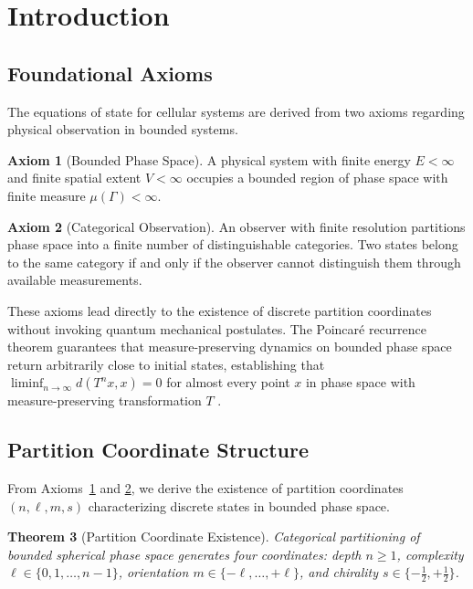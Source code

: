 \documentclass[12pt,a4paper]{article}
\theoremstyle{plain}
\newtheorem{theorem}{Theorem}[section]
\theoremstyle{definition}
\newtheorem{axiom}[theorem]{Axiom}
\theoremstyle{remark}
\begin{document}
\tableofcontents
\newpage

\section{Introduction}
\label{sec:introduction}

\subsection{Foundational Axioms}

The equations of state for cellular systems are derived from two axioms regarding physical observation in bounded systems.

\begin{axiom}[Bounded Phase Space]
\label{ax:bounded}
A physical system with finite energy $E < \infty$ and finite spatial extent $V < \infty$ occupies a bounded region of phase space with finite measure $\mu(\Gamma) < \infty$.
\end{axiom}

\begin{axiom}[Categorical Observation]
\label{ax:categorical}
An observer with finite resolution partitions phase space into a finite number of distinguishable categories. Two states belong to the same category if and only if the observer cannot distinguish them through available measurements.
\end{axiom}

These axioms lead directly to the existence of discrete partition coordinates without invoking quantum mechanical postulates. The Poincaré recurrence theorem \citep{poincare1890probleme} guarantees that measure-preserving dynamics on bounded phase space return arbitrarily close to initial states, establishing that $\liminf_{n \to \infty} d(T^n x, x) = 0$ for almost every point $x$ in phase space with measure-preserving transformation $T$ \citep{katok1995introduction}.

\subsection{Partition Coordinate Structure}

From Axioms~\ref{ax:bounded} and \ref{ax:categorical}, we derive the existence of partition coordinates $(n,\ell,m,s)$ characterizing discrete states in bounded phase space.

\begin{theorem}[Partition Coordinate Existence]
\label{thm:partition_existence}
Categorical partitioning of bounded spherical phase space generates four coordinates: depth $n \geq 1$, complexity $\ell \in \{0,1,\ldots,n-1\}$, orientation $m \in \{-\ell,\ldots,+\ell\}$, and chirality $s \in \{-\tfrac{1}{2},+\tfrac{1}{2}\}$.
\end{theorem}
\end{document}
